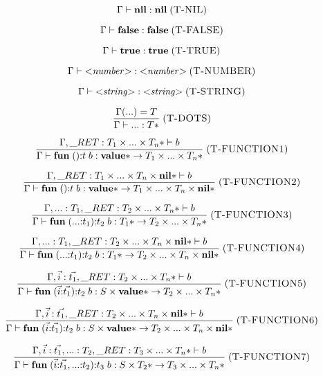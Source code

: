 \[
\Gamma \vdash \mathbf{nil} : \mathbf{nil}
\; (\textsc{T-NIL})
\]

\[
\Gamma \vdash \mathbf{false} : \mathbf{false}
\; (\textsc{T-FALSE})
\]

\[
\Gamma \vdash \mathbf{true} : \mathbf{true}
\; (\textsc{T-TRUE})
\]

\[
\Gamma \vdash {<}{\it number}{>} : {<}{\it number}{>}
\; (\textsc{T-NUMBER})
\]

\[
\Gamma \vdash {<}{\it string}{>} : {<}{\it string}{>}
\; (\textsc{T-STRING})
\]

\[
\frac{\Gamma({...}) = T}
     {\Gamma \vdash {...} : T{*}}
\; (\textsc{T-DOTS})
\]

\[
\frac{\env, \ret:T_{1} \times ... \times T_{n}* \vdash b}
     {\env \vdash \mathbf{fun} \; (){:}t \; b :
      \Value{*} \rightarrow T_{1} \times ... \times T_{n}*}
\mylabel{T-FUNCTION1}
\]

\[
\frac{\env, \ret:T_{1} \times ... \times T_{n} \times \Nil{*} \vdash b}
     {\env \vdash \mathbf{fun} \; (){:}t \; b :
      \Value{*} \rightarrow T_{1} \times ... \times T_{n} \times \Nil{*}}
\mylabel{T-FUNCTION2}
\]

\[
\frac{\env, {...}:T_{1}, \ret:T_{2} \times ... \times T_{n}* \vdash b}
     {\env \vdash \mathbf{fun} \; ({...}{:}t_{1}){:}t_{2} \; b :
      T_{1}{*} \rightarrow T_{2} \times ... \times T_{n}*}
\mylabel{T-FUNCTION3}
\]

\[
\frac{\env, {...}:T_{1}, \ret:T_{2} \times ... \times T_{n} \times \Nil{*} \vdash b}
     {\env \vdash \mathbf{fun} \; ({...}{:}t_{1}){:}t_{2} \; b :
      T_{1}{*} \rightarrow T_{2} \times ... \times T_{n} \times \Nil{*}}
\mylabel{T-FUNCTION4}
\]

\[
\frac{\env, \vec{i}:\vec{t_{1}},
      \ret:T_{2} \times ... \times T_{n}* \vdash b}
     {\env \vdash \mathbf{fun} \; (\vec{i}{:}\vec{t_{1}}){:}t_{2} \; b :
      S \times \Value{*} \rightarrow T_{2} \times ... \times T_{n}*}
\mylabel{T-FUNCTION5}
\]

\[
\frac{\env, \vec{i}:\vec{t_{1}},
      \ret:T_{2} \times ... \times T_{n} \times \Nil{*} \vdash b}
     {\env \vdash \mathbf{fun} \; (\vec{i}{:}\vec{t_{1}}){:}t_{2} \; b :
      S \times \Value{*} \rightarrow T_{2} \times ... \times T_{n} \times \Nil{*}}
\mylabel{T-FUNCTION6}
\]

\[
\frac{\env, \vec{i}:\vec{t_{1}}, {...}:T_{2},
      \ret:T_{3} \times ... \times T_{n}* \vdash b}
     {\env \vdash \mathbf{fun} \; (\vec{i}{:}\vec{t_{1}},{...}{:}t_{2}){:}t_{3} \; b :
      S \times T_{2}* \rightarrow T_{3} \times ... \times T_{n}*}
\mylabel{T-FUNCTION7}
\]

